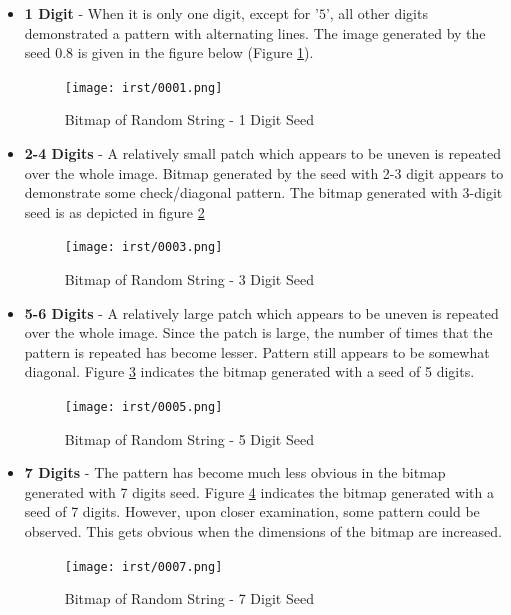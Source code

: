 \begin{itemize}
    \item \textbf{1 Digit} - When it is only one digit, except for '$5$', all other digits demonstrated a pattern with alternating lines. The image generated by the seed $0.8$ is given in the figure below (Figure \ref{fig:4_seed_1}).
    
    \begin{figure}[h!]
        \texttt{[image: irst/0001.png]}
        \centering
        \caption{Bitmap of Random String - 1 Digit Seed}
        \label{fig:4_seed_1}
    \end{figure}
    
    \item \textbf{2-4 Digits} - A relatively small patch which appears to be uneven is repeated over the whole image. Bitmap generated by  the seed with 2-3 digit appears to demonstrate some check/diagonal pattern. The bitmap generated with 3-digit seed is as depicted in figure \ref{fig:4_seed_3}
    
    \begin{figure}[h!]
        \texttt{[image: irst/0003.png]}
        \centering
        \caption{Bitmap of Random String - 3 Digit Seed}
        \label{fig:4_seed_3}
    \end{figure}
    
    \item \textbf{5-6 Digits} - A relatively large patch which appears to be uneven is repeated over the whole image. Since the patch is large, the number of times that the pattern is repeated has become lesser. Pattern still appears to be somewhat diagonal. Figure \ref{fig:4_seed_5} indicates the bitmap generated with a seed of 5 digits.
    
    \begin{figure}[h!]
        \texttt{[image: irst/0005.png]}
        \centering
        \caption{Bitmap of Random String - 5 Digit Seed}
        \label{fig:4_seed_5}
    \end{figure}
    
    \item \textbf{7 Digits} - The pattern has become much less obvious in the bitmap generated with 7 digits seed. Figure \ref{fig:4_seed_7} indicates the bitmap generated with a seed of 7 digits. However, upon closer examination, some pattern could be observed. This gets obvious when the dimensions of the bitmap are increased.
    
    \begin{figure}[h!]
        \texttt{[image: irst/0007.png]}
        \centering
        \caption{Bitmap of Random String - 7 Digit Seed}
        \label{fig:4_seed_7}
    \end{figure}
    

\end{itemize}
